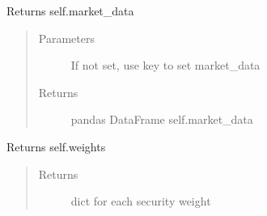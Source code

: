 \documentclass[letterpaper,10pt,english]{sphinxmanual}
\begin{document}
\begin{fulllineitems}

\begin{fulllineitems}
\label{\detokenize{securities:risk_dash.securities.Portfolio.get_portfolio_marketdata}}
\sphinxAtStartPar
Returns self.market\_data
\begin{quote}\begin{description}
\item[{Parameters}] \leavevmode
\sphinxAtStartPar
{} \textendash{} If not set, use key to set market\_data

\item[{Returns}] \leavevmode
\sphinxAtStartPar
pandas DataFrame self.market\_data

\end{description}\end{quote}

\end{fulllineitems}


\begin{fulllineitems}
\label{\detokenize{securities:risk_dash.securities.Portfolio.get_weights}}
\sphinxAtStartPar
Returns self.weights
\begin{quote}\begin{description}
\item[{Returns}] \leavevmode
\sphinxAtStartPar
dict for each security weight

\end{description}\end{quote}

\end{fulllineitems}



\end{fulllineitems}
\end{document}
